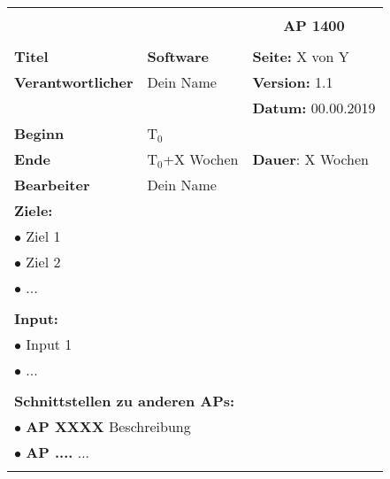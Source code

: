 \clearpage
\begin{table}[!h]
 \begin{center}
  \begin{tabular}{|p{35mm}||p{55mm}|p{50mm}||p{40mm}|}
   \hline
   \multicolumn{3}{|l||}{\textbf{}} & \multicolumn{1}{c|}{}\\
   \multicolumn{3}{|l||}{\textbf{}} & \multicolumn{1}{c|}{\textbf{AP 1400}}\\
   \multicolumn{3}{|l||}{\textbf{}} & \multicolumn{1}{c|}{}\\
   \hline\hline
   \textbf{Titel} & \multicolumn{2}{p{7cm}||}{\textbf{Software}} & \textbf{Seite:} X von Y\\
   \hline
   \textbf{Verantwortlicher} & \multicolumn{2}{l||}{Dein Name} & \textbf{Version:} 1.1\\
   \hline
   \multicolumn{3}{|l||}{} & \textbf{Datum:} 00.00.2019\\
   \hline\hline
   \textbf{Beginn} & \multicolumn{2}{l||}{T$_0$} & \\
   \hline
   \textbf{Ende} & \multicolumn{2}{l||}{T$_0$+X Wochen} & \textbf{Dauer}: X Wochen\\
   \hline\hline
   \textbf{Bearbeiter} & \multicolumn{3}{l|}{Dein Name}\\
   \hline\hline
   \multicolumn{4}{|p{150mm}|}{\textbf{Ziele:}}\\
   \multicolumn{4}{|p{150mm}|}{$\bullet$ Ziel 1}\\
   \multicolumn{4}{|p{150mm}|}{$\bullet$ Ziel 2}\\
   \multicolumn{4}{|p{150mm}|}{$\bullet$ ...}\\
   \multicolumn{4}{|p{150mm}|}{}\\
   \multicolumn{4}{|p{150mm}|}{\textbf{Input:}}\\
   \multicolumn{4}{|p{150mm}|}{$\bullet$ Input 1}\\
   \multicolumn{4}{|p{150mm}|}{$\bullet$ ...}\\
   \multicolumn{4}{|p{150mm}|}{}\\
   \multicolumn{4}{|p{150mm}|}{\textbf{Schnittstellen zu anderen APs:}}\\
   \multicolumn{4}{|p{150mm}|}{$\bullet$ \textbf{AP XXXX} Beschreibung}\\
   \multicolumn{4}{|p{150mm}|}{$\bullet$ \textbf{AP ....} ...}\\
   \multicolumn{4}{|p{150mm}|}{}\\

\end{tabular}
\end{center}
\end{table}
